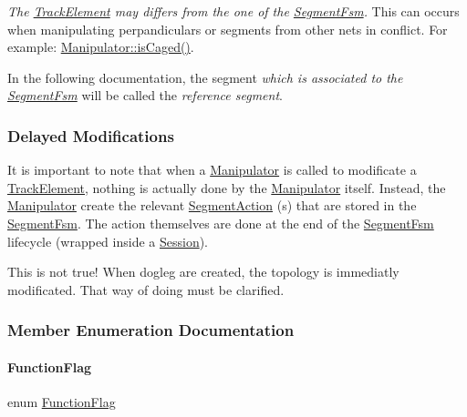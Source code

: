 {\itshape The \mbox{\hyperlink{classKite_1_1TrackElement}{Track\+Element}} may differs from the one of the \mbox{\hyperlink{classKite_1_1SegmentFsm}{Segment\+Fsm}}.} This can occurs when manipulating perpandiculars or segments from other nets in conflict. For example\+: \mbox{\hyperlink{classKite_1_1Manipulator_a722e514efb92d4a05e4f4d9e1fe7f94b}{Manipulator\+::is\+Caged()}}.

In the following documentation, the segment {\itshape which is associated to the \mbox{\hyperlink{classKite_1_1SegmentFsm}{Segment\+Fsm}}} will be called the {\itshape reference segment}.\hypertarget{classKite_1_1Manipulator_secManipDelayed}{}\subsubsection{Delayed Modifications}\label{classKite_1_1Manipulator_secManipDelayed}
It is important to note that when a \mbox{\hyperlink{classKite_1_1Manipulator}{Manipulator}} is called to modificate a \mbox{\hyperlink{classKite_1_1TrackElement}{Track\+Element}}, nothing is actually done by the \mbox{\hyperlink{classKite_1_1Manipulator}{Manipulator}} itself. Instead, the \mbox{\hyperlink{classKite_1_1Manipulator}{Manipulator}} create the relevant \mbox{\hyperlink{classKite_1_1SegmentAction}{Segment\+Action}} (s) that are stored in the \mbox{\hyperlink{classKite_1_1SegmentFsm}{Segment\+Fsm}}. The action themselves are done at the end of the \mbox{\hyperlink{classKite_1_1SegmentFsm}{Segment\+Fsm}} lifecycle (wrapped inside a \mbox{\hyperlink{classKite_1_1Session}{Session}}).

This is not true! When dogleg are created, the topology is immediatly modificated. That way of doing must be clarified. 

\subsubsection{Member Enumeration Documentation}
\mbox{\label{classKite_1_1Manipulator_a2af2ad6b6441614038caf59d04b3b217}} 
\paragraph{\texorpdfstring{Function\+Flag}{FunctionFlag}}
{\footnotesize\ttfamily enum \mbox{\hyperlink{classKite_1_1Manipulator_a2af2ad6b6441614038caf59d04b3b217}{Function\+Flag}}}

